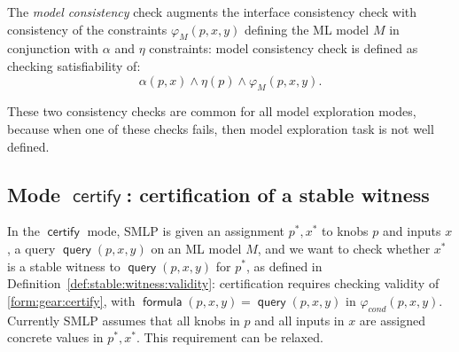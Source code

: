 \documentclass[a4paper,parskip=half]{article} %
\newcommand*\eqdef=
\newcommand*\query{\operatorname{\mathsf{query}}}
\newcommand*\formula{\operatorname{\mathsf{formula}}}
\newcommand*\mode[1]{\operatorname{\mathsf{#1}}} %
\newcommand\todozk[1]{\textcolor{red}{#1}}
\newcommand*\ZK{\todozk}
\newcommand{\delete}[1]{}
\begin{document}
The \emph{model consistency} check augments the interface consistency check with consistency of the constraints $\varphi_M(p,x,y)$ 
defining the ML model $M$ in conjunction with $\alpha$ and $\eta$ constraints: model consistency check is defined as checking satisfiability of:
\begin{equation}\label{form:model:consistency}
\alpha(p, x) \wedge \eta(p) \wedge \varphi_M(p,x,y). 
\end{equation}

These two consistency checks are common for all model exploration modes, because when one of these checks fails, 
then model exploration task is not well defined. 

\delete{
One other vacuity related check which is common to all model exploration modes is the \emph{configuration consistency check}.
It is defined as checking the satisfiability of:  

\begin{equation}\label{form:configuration:consistency}
\alpha(p, x) \wedge \eta(p) \wedge \vartheta(p,x)  \wedge \varphi_M(p,x,y) \wedge \beta(p,x,y),
\end{equation}
\noindent where $\vartheta(p,x)$ is the formula inferred form value assignments to $p,x$ in the witness for a query in 
$\mode{certify}$ mode, value assignments to $p$ in the configuration for an assertion in the $\mode{verify}$ mode, 
and is true in other modes; and $\beta(p,x,y)$ is true in $\mode{certify}$ and $\mode{verify}$ modes.
\ZK{In fact, $ \vartheta_{witn}(p,x)$ plays the role of $\beta(p,x,y)$ when the latter does not actually depend on $y$..
Better concept might be (1) to use $\vartheta_{conf}$ instead of $\vartheta_{witn}$, that is, evan in certification mode only 
knobs are assigned in the witness while inputs are not assigned, and (2) to not refer to  $\vartheta_{witn}$ in the formula and instead 
say $\beta$ is  $\vartheta_{conf}$ when the mode is certify or verify.}
}


\subsection{Mode $\mode{certify}$: certification of a stable witness}\label{sect:certify}

In the $\mode{certify}$ mode, SMLP is given an assignment $p^*,x^*$ to knobs $p$ and inputs $x$, 
 a query $\query(p,x,y)$ on an ML model $M$, and we want to check whether $x^*$ is a stable witness to
 $\query(p,x,y)$ for $p^*$, as defined in Definition~\ref{def:stable:witness:validity}:
certification requires checking validity of \cref{form:gear:certify}, with $\formula(p,x,y) \eqdef \query(p,x,y)$ in
$\varphi_{\mathit{cond}}(p,x,y)$. 
Currently SMLP assumes that all knobs in $p$ and all inputs in $x$ are assigned concrete values in $p^*, x^*$.
This requirement can be relaxed. 
\end{document}
